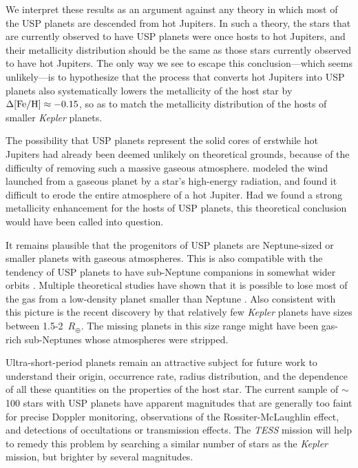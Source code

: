 \documentclass[twocolumn]{aastex6}
\begin{document}
We interpret these results as an argument against any theory in which
most of the USP planets are descended from hot Jupiters.  In such a
theory, the stars that are currently observed to have USP planets were
once hosts to hot Jupiters, and their metallicity distribution should
be the same as those stars currently observed to have hot Jupiters.
The only way we see to escape this conclusion---which seems
unlikely---is to hypothesize that the process that converts hot
Jupiters into USP planets also systematically lowers the metallicity
of the host star by $\Delta {\rm [Fe/H]} \approx -0.15$, so as to
match the metallicity distribution of the hosts of smaller {\it
  Kepler} planets.

The possibility that USP planets represent the solid cores of
erstwhile hot Jupiters had already been deemed unlikely on theoretical
grounds, because of the difficulty of removing such a massive gaseous
atmosphere. \citet{MurrayClay+2009} modeled the wind launched from a
gaseous planet by a star's high-energy radiation, and found it
difficult to erode the entire atmosphere of a hot Jupiter.  Had we
found a strong metallicity enhancement for the hosts of USP planets,
this theoretical conclusion would have been called into question.

It remains plausible that the progenitors of USP planets are
Neptune-sized or smaller planets with gaseous atmospheres.  This is
also compatible with the tendency of USP planets to have sub-Neptune
companions in somewhat wider orbits
\citep{SanchisOjeda+2014,Adams+2017}. Multiple theoretical studies
have shown that it is possible to lose most of the gas from a
low-density planet smaller than Neptune \citep{HoweBurrows2015,
  Lopez2016, Jackson+2017, SivanGinzburg2017}. Also consistent with
this picture is the recent discovery by \citet{Fulton+2017} that
relatively few {\it Kepler} planets have sizes between
1.5-2~$R_\oplus$. The missing planets in this size range might have
been gas-rich sub-Neptunes whose atmospheres were stripped.

Ultra-short-period planets remain an attractive subject for future
work to understand their origin, occurrence rate, radius distribution,
and the dependence of all these quantities on the properties of the
host star. The current sample of $\sim$100 stars with USP planets have
apparent magnitudes that are generally too faint for precise Doppler
monitoring, observations of the Rossiter-McLaughlin effect, and
detections of occultations or transmission effects. The {\it TESS}
mission \citep{Ricker+2015} will help to remedy this problem by
searching a similar number of stars as the {\it Kepler} mission, but
brighter by several magnitudes.
\end{document}
